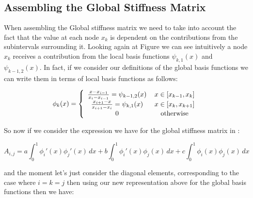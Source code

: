 \subsection{Assembling the Global Stiffness Matrix}\label{sec:oned-deterministic-global-stiffness-assembly}


When assembling the Global stiffness matrix we need to take into account the
fact that the value at each node $x_k$ is dependent on the contributions from
the subintervals surrounding it. Looking again at Figure
 we can see intuitively a node $x_k$ receives a
contribution from the local basis functions $\psi_{k,1}(x)$ and
$\psi_{{k-1},2}(x)$. In fact, if we consider our definitions of the global
basis functions  we can write them in terms of local
basis functions as follows:

\begin{equation}\label{eq:oned-deterministic-local-global-basis}
    \phi_k(x) = \left\{\begin{array}{c c}
                    \frac{x - x_{i-1}}{x_i - x_{i-1}} = \psi_{{k-1},2}(x)\, & x \in [x_{k-1}, x_k] \\
                    \frac{x_{i+1} - x}{x_{i+1} - x_i} = \psi_{k, 1}(x)\, & x \in [x_k, x_{k+1}] \\
                    0\, & \text{otherwise}
             \end{array}\right.
\end{equation}

So now if we consider the expression we have for the global stiffness matrix in
:

\[
   A_{i,j} = a\int_0^1\phi_i'(x)\phi_j'(x)\, dx
             + b\int_0^1\phi_i'(x)\phi_j(x)\, dx
             + c\int_0^1\phi_i(x)\phi_j(x)\, dx
\]

and the moment let's just consider the diagonal elements, corresponding to the
case where $i = k = j$ then using our new representation above for the global
basis functions then we have:

